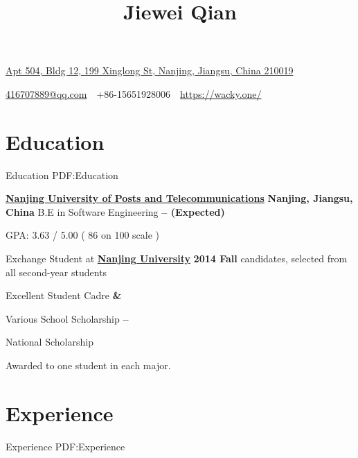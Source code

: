 \documentclass[a4paper,MMMyyyy,nonstop]{simpleresumecv}
\newcommand{\CVAuthor}{Jiewei Qian}
\newcommand{\CVWebpage}{https://wacky.one/}
\begin{document}
\thispagestyle{empty}


\title{\CVAuthor}

\begin{subtitle}
\href{https://www.google.com/maps/place/504,+199+Xing+Long+Da+Jie,+Jianye+Qu,+Nanjing+Shi,+Jiangsu+Sheng,+China,+210019/}
{Apt 504, Bldg 12, 199 Xinglong St, Nanjing, Jiangsu, China 210019}
\par
\href{mailto:416707889@qq.com}
{416707889@qq.com}
\,\SubBulletSymbol\,
+86-15651928006
\,\SubBulletSymbol\,
\href{\CVWebpage}
{\CVWebpage}
\end{subtitle}

\begin{body}


\section
{Education}
{Education}
{PDF:Education}

\href{http://www.njupt.edu.cn/}
{\textbf{Nanjing University of Posts and Telecommunications}}
\hfill \textbf{ Nanjing, Jiangsu, China }
\BulletItem
B.E in Software Engineering
\hfill
\textbf{
     --
     (Expected)
}

\BulletItem
GPA: 3.63 / 5.00 ( 86 on 100 scale )

\BulletItem
Exchange Student at \href{http://www.nju.edu.cn/}{\textbf{Nanjing University}}
\hfill
\textbf{
    2014 Fall
}
 candidates, selected from all second-year students

\BulletItem
Excellent Student Cadre
\hfill
\textbf{
     \& 
}

\BulletItem
Various School Scholarship
\hfill
\textbf{
     --  
}

\BulletItem
National Scholarship
\hfill
\textbf{
}
\begin{detail}
\SubItem
Awarded to one student in each major.
\end{detail}


\section
{Experience}
{Experience}
{PDF:Experience}


\end{body}
\end{document}
